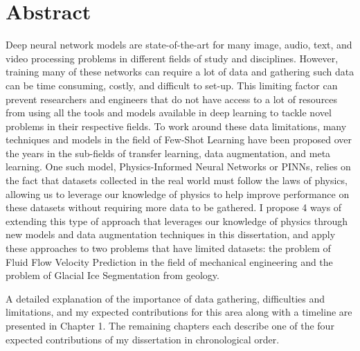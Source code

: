 
\chapter*{Abstract}
Deep neural network models are state-of-the-art for many image, audio, text, and video processing problems in different fields of study and disciplines. However, training many of these networks can require a lot of data and gathering such data can be time consuming, costly, and difficult to set-up.  This limiting factor can prevent researchers and engineers that do not have access to a lot of resources from using all the tools and models available in deep learning to tackle novel problems in their respective fields. To work around these data limitations, many techniques and models in the field of Few-Shot Learning have been proposed over the years in the sub-fields of transfer learning, data augmentation, and meta learning. One such model, Physics-Informed Neural Networks or PINNs, relies on the fact that datasets collected in the real world must follow the laws of physics, allowing us to leverage our knowledge of physics to help improve performance on these datasets without requiring more data to be gathered. I propose 4 ways of extending this type of approach that leverages our knowledge of physics through new models and data augmentation techniques in this dissertation, and apply these approaches to two problems that have limited datasets: the problem of Fluid Flow Velocity Prediction in the field of mechanical engineering and the problem of Glacial Ice Segmentation from geology. 

A detailed explanation of the importance of data gathering, difficulties and limitations, and my expected contributions for this area along with a timeline are presented in Chapter 1. The remaining chapters each describe one of the four expected contributions of my dissertation in chronological order.
